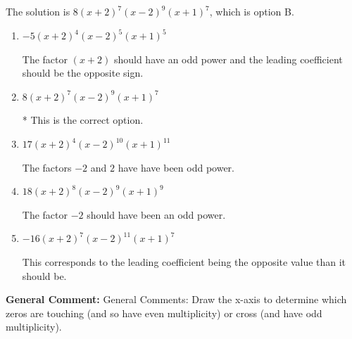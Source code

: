 \documentclass{extbook}[14pt]
\begin{document}
\begin{enumerate}
{The solution is \( 8(x + 2)^{7} (x - 2)^{9} (x + 1)^{7} \), which is option B.\begin{enumerate}[label=\Alph*.]
\item \( -5(x + 2)^{4} (x - 2)^{5} (x + 1)^{5} \)

The factor $(x + 2)$ should have an odd power and the leading coefficient should be the opposite sign.
\item \( 8(x + 2)^{7} (x - 2)^{9} (x + 1)^{7} \)

* This is the correct option.
\item \( 17(x + 2)^{4} (x - 2)^{10} (x + 1)^{11} \)

The factors $-2$ and $2$ have have been odd power.
\item \( 18(x + 2)^{8} (x - 2)^{9} (x + 1)^{9} \)

The factor $-2$ should have been an odd power.
\item \( -16(x + 2)^{7} (x - 2)^{11} (x + 1)^{7} \)

This corresponds to the leading coefficient being the opposite value than it should be.
\end{enumerate}

\textbf{General Comment:} General Comments: Draw the x-axis to determine which zeros are touching (and so have even multiplicity) or cross (and have odd multiplicity).
}
\end{enumerate}
\end{document}
